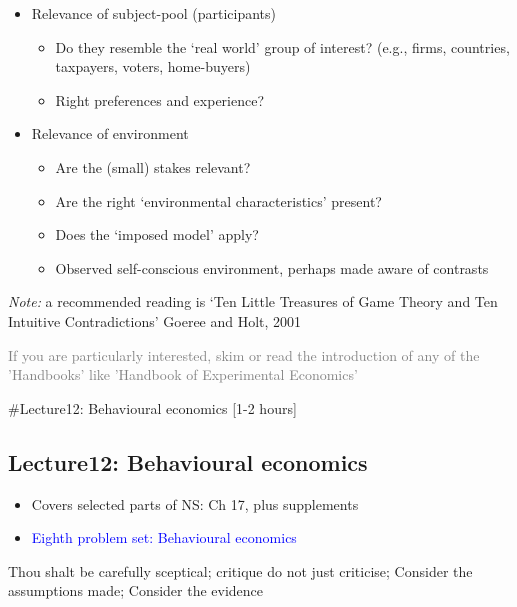 \documentclass[]{article}
\providecommand{\tightlist}{%
  \setlength{\itemsep}{0pt}\setlength{\parskip}{0pt}}
\begin{document}
\begin{itemize}
\tightlist
\item
  Relevance of subject-pool (participants)

  \begin{itemize}
  \tightlist
  \item
    Do they resemble the `real world' group of interest? (e.g., firms, countries, taxpayers, voters, home-buyers)
  \item
    Right preferences and experience?
  \end{itemize}
\item
  Relevance of environment

  \begin{itemize}
  \tightlist
  \item
    Are the (small) stakes relevant?
  \item
    Are the right `environmental characteristics' present?
  \item
    Does the `imposed model' apply?
  \item
    Observed self-conscious environment, perhaps made aware of contrasts
  \end{itemize}
\end{itemize}

\emph{Note:} a recommended reading is `Ten Little Treasures of Game Theory and Ten Intuitive Contradictions' Goeree and Holt, 2001

\textcolor{gray}{If you are particularly interested, skim or read the introduction of any of the 'Handbooks' like 'Handbook of Experimental Economics'}

\#Lecture12: Behavioural economics {[}1-2 hours{]}

\hypertarget{lecture12-behavioural-economics}{%
\subsection{Lecture12: Behavioural economics}\label{lecture12-behavioural-economics}}

\begin{itemize}
\item
  Covers selected parts of NS: Ch 17, plus supplements
\item
  \textcolor{blue}{Eighth problem set: Behavioural economics}
\end{itemize}

Thou shalt be carefully sceptical; critique do not just criticise;
Consider the assumptions made; Consider the evidence
\end{document}
